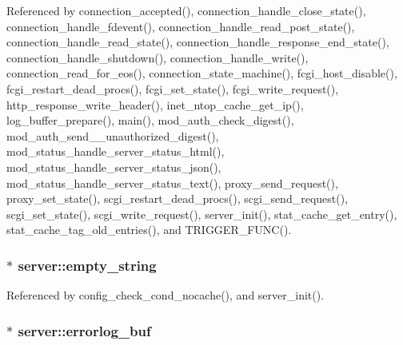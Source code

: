 Referenced by connection\-\_\-accepted(), connection\-\_\-handle\-\_\-close\-\_\-state(), connection\-\_\-handle\-\_\-fdevent(), connection\-\_\-handle\-\_\-read\-\_\-post\-\_\-state(), connection\-\_\-handle\-\_\-read\-\_\-state(), connection\-\_\-handle\-\_\-response\-\_\-end\-\_\-state(), connection\-\_\-handle\-\_\-shutdown(), connection\-\_\-handle\-\_\-write(), connection\-\_\-read\-\_\-for\-\_\-eos(), connection\-\_\-state\-\_\-machine(), fcgi\-\_\-host\-\_\-disable(), fcgi\-\_\-restart\-\_\-dead\-\_\-procs(), fcgi\-\_\-set\-\_\-state(), fcgi\-\_\-write\-\_\-request(), http\-\_\-response\-\_\-write\-\_\-header(), inet\-\_\-ntop\-\_\-cache\-\_\-get\-\_\-ip(), log\-\_\-buffer\-\_\-prepare(), main(), mod\-\_\-auth\-\_\-check\-\_\-digest(), mod\-\_\-auth\-\_\-send\-\_\-\_\-unauthorized\-\_\-digest(), mod\-\_\-status\-\_\-handle\-\_\-server\-\_\-status\-\_\-html(), mod\-\_\-status\-\_\-handle\-\_\-server\-\_\-status\-\_\-json(), mod\-\_\-status\-\_\-handle\-\_\-server\-\_\-status\-\_\-text(), proxy\-\_\-send\-\_\-request(), proxy\-\_\-set\-\_\-state(), scgi\-\_\-restart\-\_\-dead\-\_\-procs(), scgi\-\_\-send\-\_\-request(), scgi\-\_\-set\-\_\-state(), scgi\-\_\-write\-\_\-request(), server\-\_\-init(), stat\-\_\-cache\-\_\-get\-\_\-entry(), stat\-\_\-cache\-\_\-tag\-\_\-old\-\_\-entries(), and T\-R\-I\-G\-G\-E\-R\-\_\-\-F\-U\-N\-C().

\hypertarget{structserver_a4b15812620c84a776595b23c69926dc8}{
\subsubsection[{empty\-\_\-string}]{$\ast$ server\-::empty\-\_\-string}}\label{structserver_a4b15812620c84a776595b23c69926dc8}


Referenced by config\-\_\-check\-\_\-cond\-\_\-nocache(), and server\-\_\-init().

\hypertarget{structserver_aaf9cb0474f87c1537eea6bb64babe84a}{
\subsubsection[{errorlog\-\_\-buf}]{$\ast$ server\-::errorlog\-\_\-buf}}\label{structserver_aaf9cb0474f87c1537eea6bb64babe84a}


